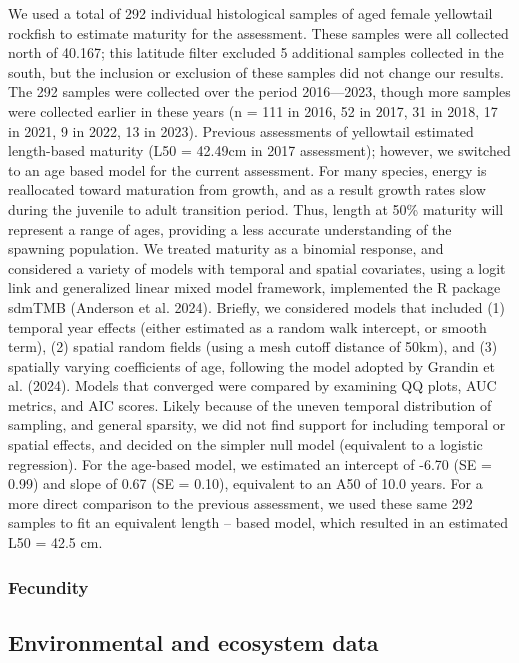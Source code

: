 \documentclass[
]{scrartcl}
\begin{document}
We used a total of 292 individual histological samples of aged female
yellowtail rockfish to estimate maturity for the assessment. These
samples were all collected north of 40.167; this latitude filter
excluded 5 additional samples collected in the south, but the inclusion
or exclusion of these samples did not change our results. The 292
samples were collected over the period 2016---2023, though more samples
were collected earlier in these years (n = 111 in 2016, 52 in 2017, 31
in 2018, 17 in 2021, 9 in 2022, 13 in 2023). Previous assessments of
yellowtail estimated length-based maturity (L50 = 42.49cm in 2017
assessment); however, we switched to an age based model for the current
assessment. For many species, energy is reallocated toward maturation
from growth, and as a result growth rates slow during the juvenile to
adult transition period. Thus, length at 50\% maturity will represent a
range of ages, providing a less accurate understanding of the spawning
population. We treated maturity as a binomial response, and considered a
variety of models with temporal and spatial covariates, using a logit
link and generalized linear mixed model framework, implemented the R
package sdmTMB (Anderson et al. 2024). Briefly, we considered models
that included (1) temporal year effects (either estimated as a random
walk intercept, or smooth term), (2) spatial random fields (using a mesh
cutoff distance of 50km), and (3) spatially varying coefficients of age,
following the model adopted by Grandin et al. (2024). Models that
converged were compared by examining QQ plots, AUC metrics, and AIC
scores. Likely because of the uneven temporal distribution of sampling,
and general sparsity, we did not find support for including temporal or
spatial effects, and decided on the simpler null model (equivalent to a
logistic regression). For the age-based model, we estimated an intercept
of -6.70 (SE = 0.99) and slope of 0.67 (SE = 0.10), equivalent to an A50
of 10.0 years. For a more direct comparison to the previous assessment,
we used these same 292 samples to fit an equivalent length -- based
model, which resulted in an estimated L50 = 42.5 cm.

\hypertarget{fecundity}{%
\subsubsection{Fecundity}\label{fecundity}}

\hypertarget{environmental-and-ecosystem-data}{%
\subsection{Environmental and ecosystem
data}\label{environmental-and-ecosystem-data}}
\end{document}
